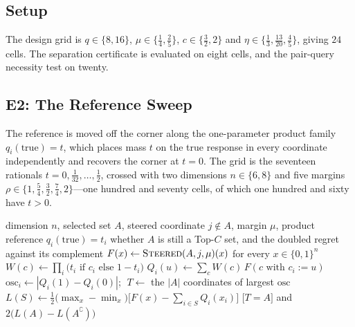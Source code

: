 \documentclass[conference]{IEEEtran}
\theoremstyle{definition}
\begin{document}
\subsection{Setup}

The design grid is $q\in\{8,16\}$, $\mu\in\{\tfrac14,\tfrac25\}$, $c\in\{\tfrac32,2\}$ and
$\eta\in\{\tfrac13,\tfrac{13}{20},\tfrac45\}$, giving $24$ cells. The separation certificate
is evaluated on eight cells, and the pair-query necessity test on twenty.

\subsection{E2: The Reference Sweep}
\label{sec:e2}

The reference is moved off the corner along the one-parameter product family
$q_{i}(\mathrm{true})=t$, which places mass $t$ on the true response in every coordinate
independently and recovers the corner at $t=0$. The grid is the seventeen rationals
$t=0,\tfrac1{32},\dots,\tfrac12$, crossed with two dimensions $n\in\{6,8\}$ and five margins
$\rho\in\{1,\tfrac54,\tfrac32,\tfrac74,2\}$---one hundred and seventy cells, of which one
hundred and sixty have $t>0$.

\begin{algorithm}[htbp]
\caption{Evaluating the construction under one reference}
\label{alg:sweep}
\begin{algorithmic}[1]
\REQUIRE dimension $n$, selected set $A$, steered coordinate $j\notin A$, margin $\mu$,
         product reference $q_{i}(\mathrm{true})=t_{i}$
\ENSURE whether $A$ is still a Top-$C$ set, and the doubled regret against its complement
\STATE $F(x)\leftarrow\textsc{Steered}(A,j,\mu)(x)$ for every $x\in\{0,1\}^{n}$
\STATE $W(c)\leftarrow\prod_{i}\bigl(t_{i}\text{ if }c_{i}\text{ else }1-t_{i}\bigr)$
  \STATE $Q_{i}(u)\leftarrow\sum_{c}W(c)\,F(c\text{ with }c_{i}:=u)$
\ENDFOR
\STATE $\mathrm{osc}_{i}\leftarrow|Q_{i}(1)-Q_{i}(0)|$;
       $\;T\leftarrow$ the $|A|$ coordinates of largest $\mathrm{osc}$
\STATE $L(S)\leftarrow\tfrac12\bigl(\max_{x}-\min_{x}\bigr)
       \bigl[F(x)-\sum_{i\in S}Q_{i}(x_{i})\bigr]$
\RETURN $\bigl[T=A\bigr]$ and $2\bigl(L(A)-L(A^{\complement})\bigr)$
\end{algorithmic}
\end{algorithm}
\end{document}
